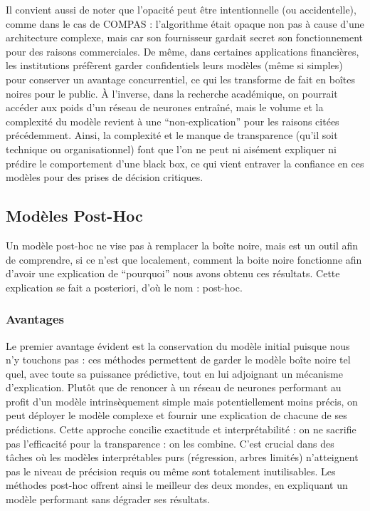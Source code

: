 \documentclass{article}
\begin{document}
Il convient aussi de noter que l’opacité peut être intentionnelle (ou accidentelle), comme dans le cas de COMPAS : l’algorithme était opaque non pas à cause d’une architecture complexe, mais car son fournisseur gardait secret son fonctionnement pour des raisons commerciales. De même, dans certaines applications financières, les institutions préfèrent garder confidentiels leurs modèles (même si simples) pour conserver un avantage concurrentiel, ce qui les transforme de fait en boîtes noires pour le public. À l’inverse, dans la recherche académique, on pourrait accéder aux poids d’un réseau de neurones entraîné, mais le volume et la complexité du modèle revient à une “non-explication” pour les raisons citées précédemment. Ainsi, la complexité et le manque de transparence (qu’il soit technique ou organisationnel) font que l’on ne peut ni aisément expliquer ni prédire le comportement d’une black box, ce qui vient entraver la confiance en ces modèles pour des prises de décision critiques.

\subsection{Modèles Post-Hoc}

\quad Un modèle post-hoc ne vise pas à remplacer la boîte noire, mais est un outil afin de comprendre, si ce n’est que localement, comment la boite noire fonctionne afin d’avoir une explication de “pourquoi” nous avons obtenu ces résultats. Cette explication se fait a posteriori, d'où le nom : post-hoc.

    \subsubsection{Avantages}
    
    \quad Le premier avantage évident est la conservation du modèle initial puisque nous n’y touchons pas : ces méthodes permettent de garder le modèle boîte noire tel quel, avec toute sa puissance prédictive, tout en lui adjoignant un mécanisme d’explication. Plutôt que de renoncer à un réseau de neurones performant au profit d’un modèle intrinsèquement simple mais potentiellement moins précis, on peut déployer le modèle complexe et fournir une explication de chacune de ses prédictions. Cette approche concilie exactitude et interprétabilité : on ne sacrifie pas l’efficacité pour la transparence : on les combine. C’est crucial dans des tâches où les modèles interprétables purs (régression, arbres limités) n’atteignent pas le niveau de précision requis ou même sont totalement inutilisables. Les méthodes post-hoc offrent ainsi le meilleur des deux mondes, en expliquant un modèle performant sans dégrader ses résultats.\\
    
\end{document}

